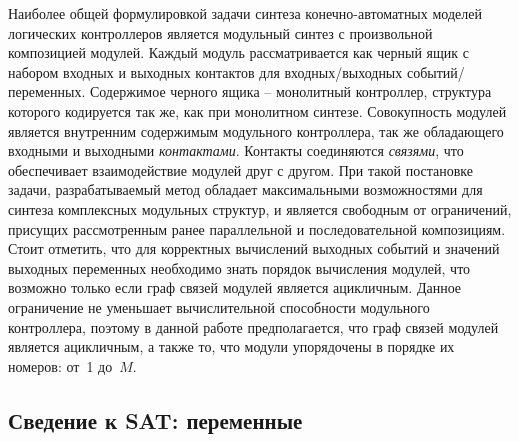 Наиболее общей формулировкой задачи синтеза конечно-автоматных моделей логических контроллеров является модульный синтез с произвольной композицией модулей.
Каждый модуль рассматривается как черный ящик с набором входных и выходных контактов для входных/выходных событий/переменных. Содержимое черного ящика \--- монолитный контроллер, структура которого кодируется так же, как при монолитном синтезе.
Совокупность модулей является внутренним содержимым модульного контроллера, так же обладающего входными и выходными \textit{контактами}.
Контакты соединяются \textit{связями}, что обеспечивает взаимодействие модулей друг с другом.
При такой постановке задачи, разрабатываемый метод обладает максимальными возможностями для синтеза комплексных модульных структур, и является свободным от ограничений, присущих рассмотренным ранее параллельной и последовательной композициям.
Стоит отметить, что для корректных вычислений выходных событий и значений выходных переменных необходимо знать порядок вычисления модулей, что возможно только если граф связей модулей является ацикличным.
Данное ограничение не уменьшает вычислительной способности модульного контроллера, поэтому в данной работе предполагается, что граф связей модулей является ацикличным, а также то, что модули упорядочены в порядке их номеров: от~1 до~$M$.



\subsection{Сведение к SAT: переменные}%
\label{sub:modular-arbitrary-variables}

